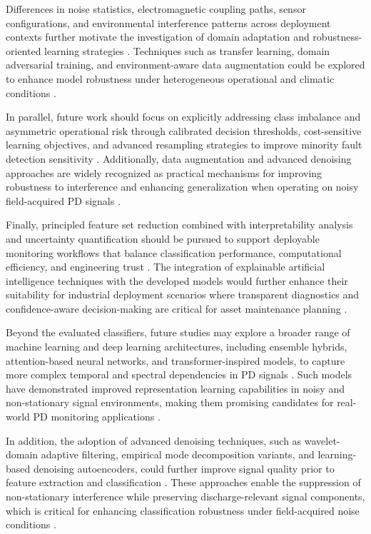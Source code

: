 Differences in noise statistics, electromagnetic coupling paths, sensor configurations, and environmental interference patterns across deployment contexts further motivate the investigation of domain adaptation and robustness-oriented learning strategies \parencite{Friebe_2024, Florkowski_2024}. 
Techniques such as transfer learning, domain adversarial training, and environment-aware data augmentation could be explored to enhance model robustness under heterogeneous operational and climatic conditions \parencite{Seitz_2024_1, Azam_2024}.

In parallel, future work should focus on explicitly addressing class imbalance and asymmetric operational risk through calibrated decision thresholds, cost-sensitive learning objectives, and advanced resampling strategies to improve minority fault detection sensitivity \parencite{Zemouri_2023_1, Adhikari_2024}. 
Additionally, data augmentation and advanced denoising approaches are widely recognized as practical mechanisms for improving robustness to interference and enhancing generalization when operating on noisy field-acquired PD signals \parencite{Bao_2024_1, Friebe_2024}.

Finally, principled feature set reduction combined with interpretability analysis and uncertainty quantification should be pursued to support deployable monitoring workflows that balance classification performance, computational efficiency, and engineering trust \parencite{Vera_2023_1, Florkowski_2024}. 
The integration of explainable artificial intelligence techniques with the developed models would further enhance their suitability for industrial deployment scenarios where transparent diagnostics and confidence-aware decision-making are critical for asset maintenance planning \parencite{Vera_2023_1, Seitz_2024_1}.

Beyond the evaluated classifiers, future studies may explore a broader range of machine learning and deep learning architectures, including ensemble hybrids, attention-based neural networks, and transformer-inspired models, to capture more complex temporal and spectral dependencies in PD signals \parencite{Zemouri_2023_1, Seitz_2024_1}. 
Such models have demonstrated improved representation learning capabilities in noisy and non-stationary signal environments, making them promising candidates for real-world PD monitoring applications \parencite{Florkowski_2024, Sikorski_2025}.

In addition, the adoption of advanced denoising techniques, such as wavelet-domain adaptive filtering, empirical mode decomposition variants, and learning-based denoising autoencoders, could further improve signal quality prior to feature extraction and classification \parencite{Bao_2024_1, Friebe_2024}. 
These approaches enable the suppression of non-stationary interference while preserving discharge-relevant signal components, which is critical for enhancing classification robustness under field-acquired noise conditions \parencite{Orellana_2023_1, Florkowski_2024}.